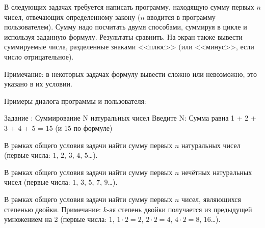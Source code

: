 
В следующих задачах требуется написать программу, находящую сумму первых $n$
чисел, отвечающих определенному закону ($n$ вводится в программу
пользователем). Сумму надо посчитать двумя способами, суммируя в цикле и
используя заданную формулу. Результаты сравнить. На экран также вывести
суммируемые числа, разделенные знаками <<плюс>> (или <<минус>>, если число
отрицательное).

Примечание: в некоторых задачах формулу вывести сложно или невозможно, это
указано в их условии.

Примеры диалога программы и пользователя:

\begin{zzoutput}
  Задание : Суммирование N натуральных чисел
  Введите N: 
  Сумма равна 1 + 2 + 3 + 4 + 5 = 15 (и 15 по формуле)
\end{zzoutput}


\bigskip


\begin{zztask}
В рамках общего условия задачи найти сумму первых $n$ натуральных чисел
(первые числа: $1$, $2$, $3$, $4$, $5$\dots).
\end{zztask}


\begin{zztask}
В рамках общего условия задачи найти сумму первых $n$ нечётных натуральных 
чисел (первые числа: $1$, $3$, $5$, $7$, $9$\dots).
\end{zztask}


\begin{zztask}
В рамках общего условия задачи найти сумму первых $n$ чисел, являющихся
степенью двойки. Примечание: $k$-ая степень двойки получается из предыдущей
умножением на 2 (первые числа: $1$, $1\cdot2=2$, $2\cdot2=4$, $4\cdot2=8$, 
$16$\dots).
\end{zztask}

